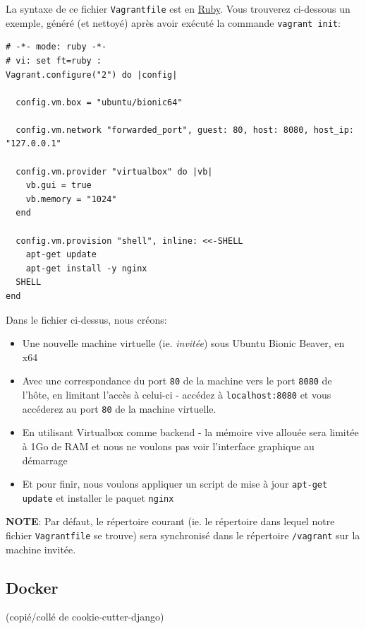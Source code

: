 \documentclass[11pt]{amsbook}
\newcommand{\admonition}[2]{\textbf{#1}: {#2}}
\begin{document}
La syntaxe de ce fichier \texttt{Vagrantfile} est en \href{https://www.ruby-lang.org/en/}{Ruby}. Vous trouverez ci-dessous un exemple, généré (et nettoyé) après avoir exécuté la commande \texttt{vagrant init}:


\begin{verbatim}
# -*- mode: ruby -*-
# vi: set ft=ruby :
Vagrant.configure("2") do |config|

  config.vm.box = "ubuntu/bionic64"

  config.vm.network "forwarded_port", guest: 80, host: 8080, host_ip: "127.0.0.1"

  config.vm.provider "virtualbox" do |vb|
    vb.gui = true
    vb.memory = "1024"
  end

  config.vm.provision "shell", inline: <<-SHELL
    apt-get update
    apt-get install -y nginx
  SHELL
end
\end{verbatim}

Dans le fichier ci-dessus, nous créons:


\begin{itemize}

\item Une nouvelle machine virtuelle (ie. \emph{invitée}) sous Ubuntu Bionic Beaver, en x64

\item Avec une correspondance du port \texttt{80} de la machine vers le port \texttt{8080} de l’hôte, en limitant l’accès à celui-ci - accédez à \texttt{localhost:8080} et vous accéderez au port \texttt{80} de la machine virtuelle.

\item En utilisant Virtualbox comme backend - la mémoire vive allouée sera limitée à 1Go de RAM et nous ne voulons pas voir l’interface graphique au démarrage

\item Et pour finir, nous voulons appliquer un script de mise à jour \texttt{apt-get update} et installer le paquet \texttt{nginx}

\end{itemize}


\admonition{NOTE}{Par défaut, le répertoire courant (ie. le répertoire dans lequel notre fichier \texttt{Vagrantfile} se trouve) sera synchronisé dans le répertoire \texttt{/vagrant} sur la machine invitée.}
\hypertarget{x-docker}{\subsection{Docker}}
(copié/collé de cookie-cutter-django)
\end{document}
